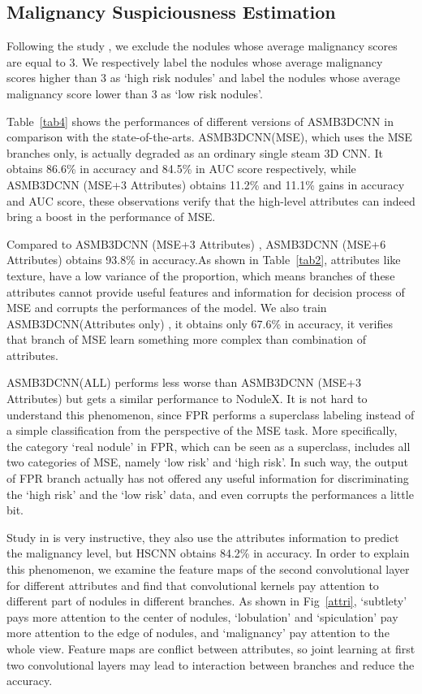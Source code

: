 \documentclass[runningheads]{llncs}
\begin{document}
\subsection{Malignancy Suspiciousness Estimation}
\label{MSE}
Following the study \cite{Shen2017Multi}\cite{Causey2018Highly}, we exclude the nodules whose average malignancy scores are equal to 3. We respectively label the nodules whose average malignancy scores higher than 3 as `high risk nodules' and  label the nodules whose average malignancy score lower than 3 as `low risk nodules'.

Table~\ref{tab4} shows the performances of different versions of ASMB3DCNN in comparison with the state-of-the-arts. ASMB3DCNN(MSE), which uses the MSE branches only, is actually degraded as an ordinary single steam 3D CNN. It obtains 86.6\% in accuracy and 84.5\% in AUC score respectively, while ASMB3DCNN (MSE+3  Attributes)  obtains 11.2\% and 11.1\% gains in accuracy and AUC score, these observations verify that the high-level attributes can indeed bring a boost in the performance of MSE.

Compared to  ASMB3DCNN (MSE+3  Attributes) ,  ASMB3DCNN (MSE+6  Attributes) obtains 93.8\% in accuracy.As shown in Table~\ref{tab2}, attributes like texture, have a low  variance of the proportion, which means branches of these attributes cannot provide useful features and information for decision process of MSE and corrupts the performances of the model.
We also train ASMB3DCNN(Attributes only) , it obtains only 67.6\%  in accuracy, it verifies that branch of MSE learn something more complex than combination of attributes.

ASMB3DCNN(ALL)  performs less worse than ASMB3DCNN (MSE+3 Attributes) but gets a similar performance to NoduleX. It is not hard to understand this phenomenon, since FPR performs a superclass labeling instead of a simple classification from the perspective of the MSE task.  More specifically, the category `real nodule' in FPR, which can be seen as a superclass, includes all two categories of MSE, namely `low risk' and `high risk'. In such way, the output of FPR branch actually has not offered any useful information for discriminating the `high risk' and the `low risk' data, and even corrupts the performances a little bit. 

Study in \cite{shen2019interpretable} is very instructive, they also use the attributes information to predict the malignancy level, but HSCNN obtains 84.2\% in accuracy. In order to explain this phenomenon, we examine  the feature maps of the second convolutional layer for different attributes and find that convolutional kernels pay attention to different part of nodules in different branches. As shown in Fig~\ref{attri}, `subtlety' pays more attention to the center of nodules, `lobulation' and `spiculation' pay more attention to the edge of nodules, and `malignancy' pay attention to the whole view. Feature maps are conflict between attributes, so joint learning at first two convolutional layers may lead to interaction between branches and reduce the accuracy.
\end{document}
